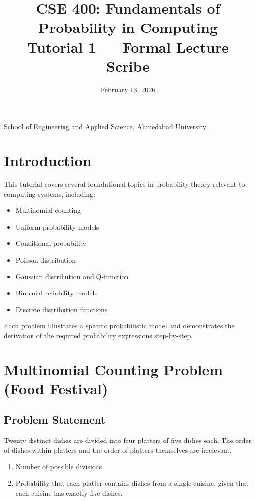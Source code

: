 \documentclass[12pt]{article}
\title{CSE 400: Fundamentals of Probability in Computing\\
Tutorial 1 --- Formal Lecture Scribe}
\date{February 13, 2026}
\begin{document}
\maketitle

School of Engineering and Applied Science, Ahmedabad University

\section{Introduction}

This tutorial covers several foundational topics in probability theory relevant to computing systems, including:

\begin{itemize}
\item Multinomial counting
\item Uniform probability models
\item Conditional probability
\item Poisson distribution
\item Gaussian distribution and Q-function
\item Binomial reliability models
\item Discrete distribution functions
\end{itemize}

Each problem illustrates a specific probabilistic model and demonstrates the derivation of the required probability expressions step-by-step.

\section{Multinomial Counting Problem (Food Festival)}

\subsection*{Problem Statement}

Twenty distinct dishes are divided into four platters of five dishes each. The order of dishes within platters and the order of platters themselves are irrelevant.

\begin{enumerate}
\item Number of possible divisions
\item Probability that each platter contains dishes from a single cuisine, given that each cuisine has exactly five dishes.
\end{enumerate}
\end{document}
